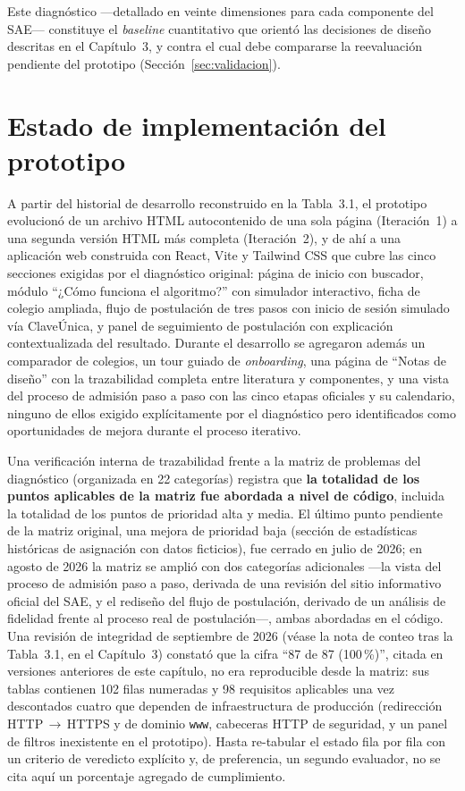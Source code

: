 Este diagnóstico —detallado en veinte dimensiones para cada componente del SAE— constituye el \emph{baseline} cuantitativo que orientó las decisiones de diseño descritas en el Capítulo~3, y contra el cual debe compararse la reevaluación pendiente del prototipo (Sección~\ref{sec:validacion}).

\section{Estado de implementación del prototipo}

A partir del historial de desarrollo reconstruido en la Tabla~3.1, el prototipo evolucionó de un archivo HTML autocontenido de una sola página (Iteración~1) a una segunda versión HTML más completa (Iteración~2), y de ahí a una aplicación web construida con React, Vite y Tailwind CSS que cubre las cinco secciones exigidas por el diagnóstico original: página de inicio con buscador, módulo ``¿Cómo funciona el algoritmo?'' con simulador interactivo, ficha de colegio ampliada, flujo de postulación de tres pasos con inicio de sesión simulado vía ClaveÚnica, y panel de seguimiento de postulación con explicación contextualizada del resultado. Durante el desarrollo se agregaron además un comparador de colegios, un tour guiado de \emph{onboarding}, una página de ``Notas de diseño'' con la trazabilidad completa entre literatura y componentes, y una vista del proceso de admisión paso a paso con las cinco etapas oficiales y su calendario, ninguno de ellos exigido explícitamente por el diagnóstico pero identificados como oportunidades de mejora durante el proceso iterativo.

Una verificación interna de trazabilidad frente a la matriz de problemas del diagnóstico (organizada en 22 categorías) registra que \textbf{la totalidad de los puntos aplicables de la matriz fue abordada a nivel de código}, incluida la totalidad de los puntos de prioridad alta y media. El último punto pendiente de la matriz original, una mejora de prioridad baja (sección de estadísticas históricas de asignación con datos ficticios), fue cerrado en julio de 2026; en agosto de 2026 la matriz se amplió con dos categorías adicionales —la vista del proceso de admisión paso a paso, derivada de una revisión del sitio informativo oficial del SAE, y el rediseño del flujo de postulación, derivado de un análisis de fidelidad frente al proceso real de postulación—, ambas abordadas en el código. Una revisión de integridad de septiembre de 2026 (véase la nota de conteo tras la Tabla~3.1, en el Capítulo~3) constató que la cifra ``87 de 87 (100\,\%)'', citada en versiones anteriores de este capítulo, no era reproducible desde la matriz: sus tablas contienen 102 filas numeradas y 98 requisitos aplicables una vez descontados cuatro que dependen de infraestructura de producción (redirección HTTP\,$\to$\,HTTPS y de dominio \texttt{www}, cabeceras HTTP de seguridad, y un panel de filtros inexistente en el prototipo). Hasta re-tabular el estado fila por fila con un criterio de veredicto explícito y, de preferencia, un segundo evaluador, no se cita aquí un porcentaje agregado de cumplimiento.

